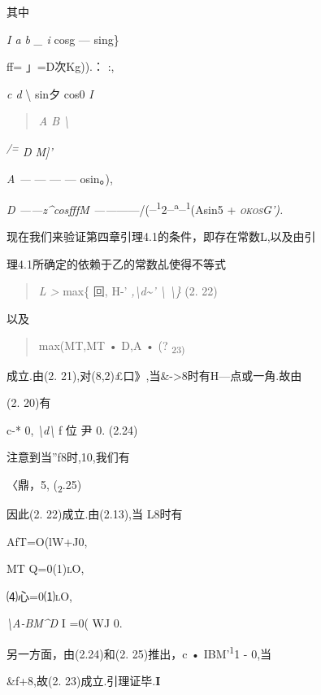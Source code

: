\documentclass{article}
\begin{document}
其中

\emph{I a b \_ i} cosg --- sing\}

ff= 」=D次Kg)).： :,

\emph{c d} \textbackslash{} sin夕 cos0 \emph{I}

\begin{quote}
\emph{A B \textbackslash{}}
\end{quote}

\emph{\textsuperscript{/=} D M{]}'}

\emph{A ---} --- --- --- osin。),

\emph{D ------z\^{}cosfffM
------}------/(\textsuperscript{\_1}2\textsuperscript{\_a\_1}(Asin5 +
\emph{\textsc{okosG').}}

现在我们来验证第四章引理4.1的条件，即存在常数L,以及由引

理4.1所确定的依赖于乙的常数乩使得不等式

\begin{quote}
\emph{L \textgreater{}} max\{ \textbar{}回\textbar{},
\textbar{}\textbar{}H-'\textbar{}\textbar{}
\emph{,\textbackslash{}d\textasciitilde{}' \textbackslash{}
\textbackslash{}\}} (2. 22)
\end{quote}

以及

\begin{quote}
max(\textbar{}MT\textbar{},\textbar{}MT\textbar{} •
\textbar{}D\textbar{},\textbar{}A\textbar{} • (? \textsubscript{23)}
\end{quote}

成立.由(2. 21),对(8,2)£口》,当\&-\textgreater{}8时有H---点或一角.故由

(2. 20)有

c-* 0, \emph{\textbackslash{}d\textbackslash{}} f 位\textbar{} 尹 0.
(2.24)

注意到当''f8时,10,我们有

〈鼎，5, (\textsubscript{2}.25)

因此(2. 22)成立.由(2.13),当 L8时有

\textbar{}AfT\textbar{}=O(lW+J0,

\textbar{}MT\textbar{} \textsc{\textbar{}Q\textbar{}=0(1)lO,}

⑷\textbar{}心\textbar{}=0⑴\textsc{lO,}

\emph{\textbackslash{}A-BM\^{}D} I =0( WJ 0.

另一方面，由(2.24)和(2. 25)推出，\textbar{}c\textbar{} •
IBM'\textsuperscript{1}1 - 0,当

\&f+8,故(2. 23)成立.引理证毕.\textbf{I}
\end{document}
